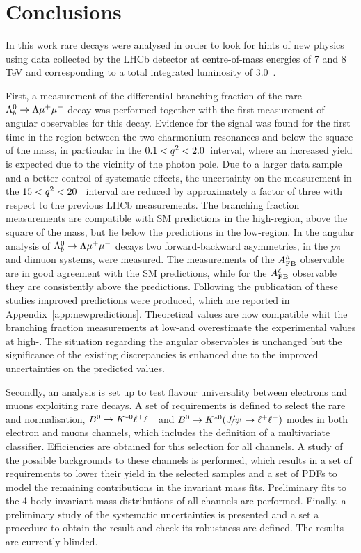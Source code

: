 \chapter{Conclusions}

In this work rare decays were analysed in order to look for hints of new physics using data collected by the LHCb 
detector at centre-of-mass energies of 7 and 8 TeV and corresponding to a total integrated luminosity of 3.0~\invfb.

First, a measurement of the differential branching fraction of the rare $\Lambda^0_b\rightarrow\Lambda\mu^+\mu^-$ decay was performed together
with the first measurement of angular observables for this decay.
Evidence for the signal was found for the first time in the \qsq region between the two charmonium resonances and 
below the square of the \jpsi mass, in particular in the $0.1 < q^2 < 2.0$~\gevgevcccc interval, 
where an increased yield is expected due to the vicinity of the photon pole. 
Due to a larger data sample and a better control of systematic effects, the uncertainty on the measurement in the $15 < q^2 < 20$~\gevgevcccc
interval are reduced by approximately a factor of three with respect to the previous LHCb measurements. 
The branching fraction measurements are compatible with SM predictions in the high-\qsq region, above the square
 of the \jpsi mass, but lie below the predictions in the low-\qsq region. In the angular analysis of $\Lambda^0_b\rightarrow\Lambda\mu^+\mu^-$ decays
 two forward-backward asymmetries, in the $p\pi$ and dimuon systems, were measured. The measurements
 of the $A_{\rm FB}^h$ observable are in good agreement with the SM predictions, while for the $A_{\rm FB}^\ell$ observable
 they are consistently above the predictions. Following the publication of these studies improved predictions
 were produced, which are reported in Appendix~\ref{app:newpredictions}. Theoretical values are now compatible
 whit the branching fraction measurements at low-\qsq and overestimate the experimental 
 values at high-\qsq. The situation regarding the angular observables is unchanged but the 
 significance of the existing discrepancies is enhanced due to the improved uncertainties on the predicted values.
 
Secondly, an analysis is set up to test flavour universality between electrons and muons exploiting rare decays.
A set of requirements is defined to select the rare and normalisation, $B^0\rightarrow K^{*0}\ell^+ \ell^-$ and $\Bz\to\Kstarz(\jpsi\to\ll)$ modes
in both electron and muons channels, which includes the definition of a multivariate classifier. 
Efficiencies are obtained for this selection for all channels.
A study of the possible backgrounds to these channels is performed, which results in
a set of requirements to lower their yield in the selected samples and a set of PDFs to model
the remaining contributions in the invariant mass fits. Preliminary fits to the 4-body invariant mass distributions
of all channels are performed. Finally, a preliminary study of the systematic uncertainties is presented and
a set a procedure to obtain the result and check its robustness are defined. The results are currently blinded.


